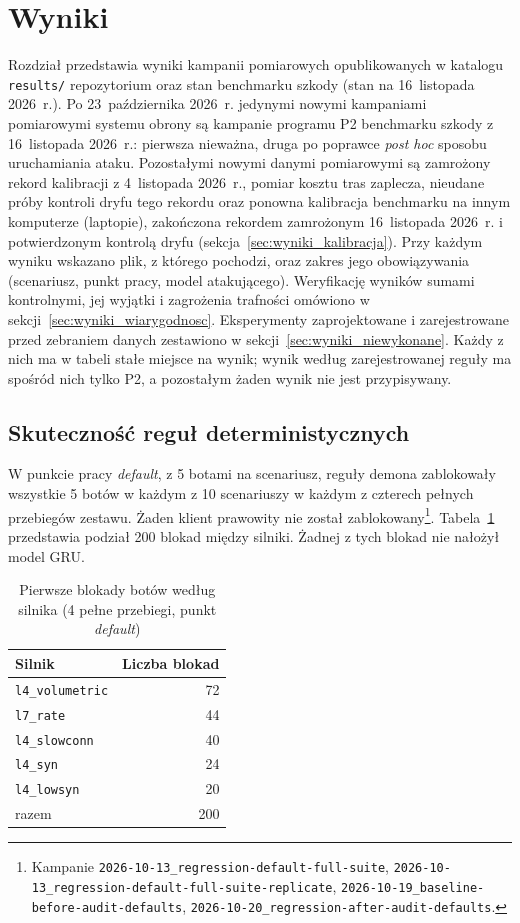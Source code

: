 \documentclass[a4paper,12pt]{article}
\begin{document}
\section{Wyniki}\label{sec:wyniki}
Rozdział przedstawia wyniki kampanii pomiarowych opublikowanych w katalogu \texttt{results/} repozytorium oraz stan benchmarku szkody (stan na 16~listopada 2026~r.). Po 23~października 2026~r. jedynymi nowymi kampaniami pomiarowymi systemu obrony są kampanie programu P2 benchmarku szkody z 16~listopada 2026~r.: pierwsza nieważna, druga po poprawce \textit{post hoc} sposobu uruchamiania ataku. Pozostałymi nowymi danymi pomiarowymi są zamrożony rekord kalibracji z 4~listopada 2026~r., pomiar kosztu tras zaplecza, nieudane próby kontroli dryfu tego rekordu oraz ponowna kalibracja benchmarku na innym komputerze (laptopie), zakończona rekordem zamrożonym 16~listopada 2026~r. i potwierdzonym kontrolą dryfu (sekcja~\ref{sec:wyniki_kalibracja}). Przy każdym wyniku wskazano plik, z którego pochodzi, oraz zakres jego obowiązywania (scenariusz, punkt pracy, model atakującego). Weryfikację wyników sumami kontrolnymi, jej wyjątki i zagrożenia trafności omówiono w sekcji~\ref{sec:wyniki_wiarygodnosc}. Eksperymenty zaprojektowane i zarejestrowane przed zebraniem danych zestawiono w sekcji~\ref{sec:wyniki_niewykonane}. Każdy z nich ma w tabeli stałe miejsce na wynik; wynik według zarejestrowanej reguły ma spośród nich tylko P2, a pozostałym żaden wynik nie jest przypisywany.

\subsection{Skuteczność reguł deterministycznych}\label{sec:wyniki_reguly}
W punkcie pracy \textit{default}, z 5 botami na scenariusz, reguły demona zablokowały wszystkie 5 botów w każdym z 10 scenariuszy w każdym z czterech pełnych przebiegów zestawu. Żaden klient prawowity nie został zablokowany\footnote{\raggedright Kampanie \texttt{2026-10-13\_regression-default-full-suite}, \texttt{2026-10-13\_regression-default-full-suite-replicate}, \texttt{2026-10-19\_baseline-before-audit-defaults}, \texttt{2026-10-20\_regression-after-audit-defaults}.}. Tabela~\ref{tab:wyniki_silniki} przedstawia podział 200 blokad między silniki. Żadnej z tych blokad nie nałożył model GRU.

\begin{table}[H]
\centering
\small
\caption{Pierwsze blokady botów według silnika (4 pełne przebiegi, punkt \textit{default})}\label{tab:wyniki_silniki}
\begin{tabular}{@{}lr@{}}
\toprule
Silnik & Liczba blokad \\
\midrule
\texttt{l4\_volumetric} & 72 \\
\texttt{l7\_rate} & 44 \\
\texttt{l4\_slowconn} & 40 \\
\texttt{l4\_syn} & 24 \\
\texttt{l4\_lowsyn} & 20 \\
\midrule
razem & 200 \\
\bottomrule
\end{tabular}
\end{table}
\end{document}
